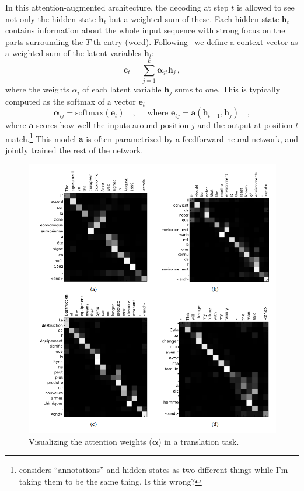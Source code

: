 \documentclass[paper=a4, fontsize=11pt,twoside, abstracton]{scrartcl}
\def\hh{{\boldsymbol h}}
\begin{document}
In this attention-augmented architecture, the decoding at step $t$ is allowed to see not only the hidden state $\hh_t$ but a weighted sum of these. Each hidden state $\hh_t$ contains information about the whole input sequence with strong focus on the parts surrounding the $T$-th entry (word). Following~\citep{bahdanau2014neural} we define a context vector as a weighted sum of the latent variables $\hh_t$:
\begin{equation}
  \boldsymbol{c}_t = \sum_{j=1}^k \boldsymbol{\alpha}_{jt} \hh_j\,,
\end{equation}
where the weights $\alpha_{i}$ of each latent variable $\hh_j$ sums to one. This is typically computed as the softmax of a vector $\boldsymbol{e}_t$
\begin{equation}
  \boldsymbol{\alpha}_{ij} = \text{softmax}(\boldsymbol{e}_t)\quad, \quad \text{ where } \boldsymbol{e}_{tj} = \boldsymbol{a}(\hh_{t-1}, \hh_j) \quad,
\end{equation}
where $\boldsymbol{a}$ scores how well the inputs around position $j$ and the output at position $t$ match.\footnote{\citet{bahdanau2014neural} considers ``annotations'' and hidden states as two different things while I'm taking them to be the same thing. Is this wrong?} This model $\boldsymbol{a}$ is often parametrized by a feedforward neural network, and jointly trained the rest of the network.



\begin{figure}
  \includegraphics[width=\linewidth]{attention_vis.png}
  \caption{Visualizing the attention weights ($\boldsymbol{\alpha}$) in a translation task.}\label{fig:attention_translation}
\end{figure}
\end{document}
